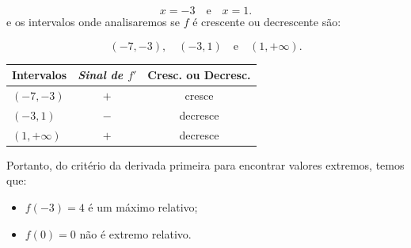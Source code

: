 \cleardoublepage\documentclass[../main.tex]{subfiles}
\begin{document}
\begin{ex}
\begin{compactenum}[a)]
\begin{solution}
\begin{compactenum}[1.]
\[ x=-3 \quad \mbox{e}\quad x=1. \]
e os intervalos onde analisaremos se \(f\) é crescente ou decrescente são:

\[ (-7,-3),\quad(-3,1)\quad \mbox{e}\quad (1,+\infty). \]

\begin{center}
  \begin{tabular}{l|c|c}
  \toprule
    \textbf{Intervalos} &	\emph{Sinal de \(f'\)} &	\textbf{Cresc. ou Decresc.}\\\hline
    \((-7,-3)\) &\(+\)& cresce\\\hline
    \((-3,1)\)&\(-\)&decresce\\\hline
    \((1,+\infty)\) & \(+\) & decresce\\
    \bottomrule
  \end{tabular}
  \end{center}
\end{compactenum}
Portanto, do critério da derivada primeira para encontrar valores extremos, temos que:
\begin{itemize}
    \item \(f(-3)=4 \) é um máximo relativo;
    \item \(f(0)=0\) não é extremo relativo.
\end{itemize}
 \end{solution}
 \end{compactenum}
\end{ex}
\end{document}
